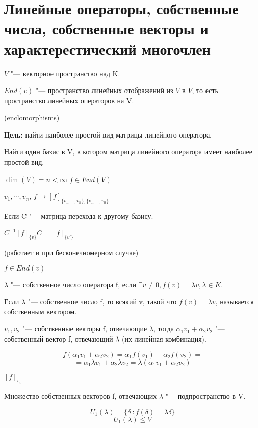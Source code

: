 ﻿\section{Линейные операторы, собственные числа, собственные векторы и 
характерестический многочлен}

$V$ "--- векторное пространство над K.

$End(v)$ "--- пространство линейных отображений из $V$ в $V$, 
то есть пространство линейных операторов на V.

(enclomorphisms)

\textbf{Цель:} найти наиболее простой вид матрицы линейного оператора.

Найти один базис в V, в котором матрица линейного оператора имеет наиболее 
простой вид.

$\dim (V) = n < \infty$
$f \in End(V)$

$v_1, \cdots, v_n$, $f \to [f]_{\{v_1, \cdots, v_n\}, \{v_1, \cdots, v_n\}}$

Если C "--- матрица перехода к другому базису. 

$C^{-1}[f]_{\{v\}}C = [f]_{\{v'\}}$

\begin{Def}
(работает и при бесконечномерном случае)

$f \in End(v)$

$\lambda$ "--- собственное число оператора f, если 
$\exists v \ne 0, f(v) = \lambda v, \lambda \in K$.
\end{Def}

\begin{Def}
   Если $\lambda$ "--- собственное число f, то всякий v, такой что $f(v) = \lambda v$, называется собственным
   вектором.
\end{Def}
\begin{Rem}
$v_1, v_2$ "--- собственные векторы f, отвечающие $\lambda$, тогда 
$\alpha_1 v_1 + \alpha_2 v_2$ "--- собственный вектор f, отвечающий $\lambda$
(их линейная комбинация).

$$f(\alpha_1 v_1 + \alpha_2 v_2) = \alpha_1 f(v_1) + \alpha_2 f(v_2) = $$
$$= \alpha_1 \lambda v_1 + \alpha_2 \lambda v_2 = \lambda(\alpha_1 v_1 + \alpha_2 v_2) $$

$[f]_{v_i}$
\end{Rem}

Множество собственных векторов f, отвечающих $\lambda$ "--- подпространство в V.

$$U_1(\lambda) = \{\delta\ \colon f(\delta) = \lambda \delta\} $$
$$U_1(\lambda) \le V$$

